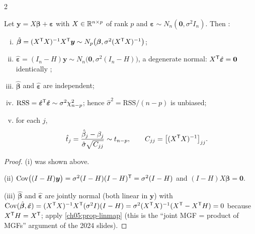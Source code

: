 \begin{paracol}{2}
\begin{theorem}\label{ch05:thm-normal}
Let $\bm y=X\bm\beta+\bm\varepsilon$ with $X\in\mathbb{R}^{n\times p}$ of rank $p$ and $\bm\varepsilon\sim N_n(\bm 0,\sigma^2I_n)$. Then
 :
\begin{enumerate}[(i)]
  \item $\hat{\bm\beta}=(X^{\mathsf T} X)^{-1}X^{\mathsf T}\bm y\sim N_p\bigl(\bm\beta,\sigma^2(X^{\mathsf T} X)^{-1}\bigr)$;
  \item $\hat{\bm\varepsilon}=(I_n-H)\bm y\sim N_n\bigl(\bm 0,\sigma^2(I_n-H)\bigr)$, a degenerate normal: $X^{\mathsf T}\hat{\bm\varepsilon}=\bm 0$ identically
        ;
  \item $\hat{\bm\beta}$ and $\hat{\bm\varepsilon}$ are independent;
  \item $\text{RSS}=\hat{\bm\varepsilon}^{\mathsf T}\hat{\bm\varepsilon}\sim\sigma^2\chi^2_{n-p}$; hence $\hat\sigma^2=\text{RSS}/(n-p)$ is unbiased;
  \item for each $j$,
        \begin{equation}\label{ch05:eq-tstat}
          \hat t_j=\frac{\hat\beta_j-\beta_j}{\hat\sigma\sqrt{C_{jj}}}\sim t_{n-p},\qquad C_{jj}=\bigl[(X^{\mathsf T} X)^{-1}\bigr]_{jj}.
        \end{equation}
\end{enumerate}
\end{theorem}
\begin{proof}
(i) was shown above.

(ii) $\operatorname{Cov}\bigl((I-H)\bm y\bigr)=\sigma^2(I-H)(I-H)^{\mathsf T}=\sigma^2(I-H)$ and $(I-H)X\bm\beta=\bm 0$.

(iii) $\hat{\bm\beta}$ and $\hat{\bm\varepsilon}$ are jointly normal (both linear in $\bm y$) with
$\operatorname{Cov}(\hat{\bm\beta},\hat{\bm\varepsilon})=(X^{\mathsf T} X)^{-1}X^{\mathsf T}(\sigma^2I)(I-H)=\sigma^2(X^{\mathsf T} X)^{-1}(X^{\mathsf T}-X^{\mathsf T} H)=0$ because $X^{\mathsf T} H=X^{\mathsf T}$; apply
\cref{ch05:prop-linmap} (this is the ``joint MGF = product of MGFs'' argument of the 2024 slides).


\end{proof}
\end{paracol}

